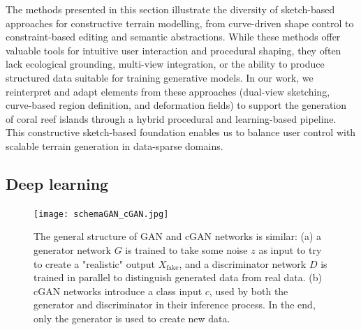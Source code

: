 \midConclusion

The methods presented in this section illustrate the diversity of sketch-based approaches for constructive terrain modelling, from curve-driven shape control to constraint-based editing and semantic abstractions. While these methods offer valuable tools for intuitive user interaction and procedural shaping, they often lack ecological grounding, multi-view integration, or the ability to produce structured data suitable for training generative models. In our work, we reinterpret and adapt elements from these approaches (dual-view sketching, curve-based region definition, and deformation fields) to support the generation of coral reef islands through a hybrid procedural and learning-based pipeline. This constructive sketch-based foundation enables us to balance user control with scalable terrain generation in data-sparse domains.




\subsection{Deep learning}
\label{sec:coral-island-sota-deep-learning}

\begin{figure}
    \texttt{[image: schemaGAN\_cGAN.jpg]}
    \caption[GAN and cGAN architectures]{The general structure of GAN and cGAN networks is similar: (a) a generator network $G$ is trained to take some noise $z$ as input to try to create a "realistic" output $X_{\text{fake}}$, and a discriminator network $D$ is trained in parallel to distinguish generated data from real data. (b) cGAN networks introduce a class input $c$, used by both the generator and discriminator in their inference process. In the end, only the generator is used to create new data.}
    \label{fig:coral-island-GAN-scheme}
\end{figure}

